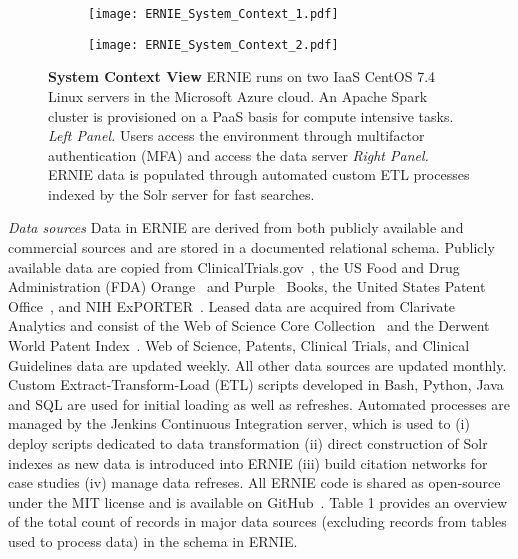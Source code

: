 \documentclass[review]{elsarticle}
\begin{document}
\begin{figure}[!h]
\flushleft
\scalebox{0.99}
{
\begin{subfigure}{.5\textwidth}
  \centering
\texttt{[image: ERNIE\_System\_Context\_1.pdf]}
  \label{fig:sub1}
\end{subfigure}
\begin{subfigure}{.5\textwidth}
 \texttt{[image: ERNIE\_System\_Context\_2.pdf]}
  \label{fig:sub2}
\end{subfigure}
}
\caption{{\bf System Context View} ERNIE runs on two IaaS CentOS 7.4 Linux servers in the Microsoft Azure cloud. An Apache Spark cluster is provisioned on a PaaS basis for compute intensive tasks. \emph{Left Panel.} Users access the environment through multifactor authentication (MFA) and access the data server \emph{Right Panel.} ERNIE data is populated through automated custom ETL processes indexed by the Solr server for fast searches.}
\label{fig: test}
\end{figure}

\emph{Data sources} Data in ERNIE are derived from both publicly available and commercial sources and are stored in a documented relational schema. Publicly available data are copied from ClinicalTrials.gov~\cite{ClinicalTrials2017},  the US Food and Drug Administration (FDA) Orange~\cite{OrangeBook2017} and Purple~\cite{PurpleBook2017} Books, the United States Patent Office~\cite{USPTO2017}, and NIH ExPORTER~\cite{NIHExporter2017}. Leased data are acquired from Clarivate Analytics and consist of the Web of Science Core Collection~\cite{WoS2017} and the Derwent World Patent Index~\cite{DWPI2017}. Web of Science, Patents, Clinical Trials, and Clinical Guidelines data are updated weekly. All other data sources are updated monthly.  Custom Extract-Transform-Load (ETL) scripts developed in Bash, Python, Java and SQL are used for initial loading as well as refreshes. Automated processes are managed by the Jenkins Continuous Integration server, which is used to (i) deploy scripts dedicated to data transformation (ii) direct construction of Solr indexes as new data is introduced into ERNIE (iii) build citation networks for case studies (iv) manage data refreses. All ERNIE code is shared as open-source under the MIT license and is available on GitHub~\cite{GithubERNIE2017}. Table 1 provides an overview of the total count of records in major data sources (excluding records from tables used to process data) in the schema in ERNIE. %
\end{document}
